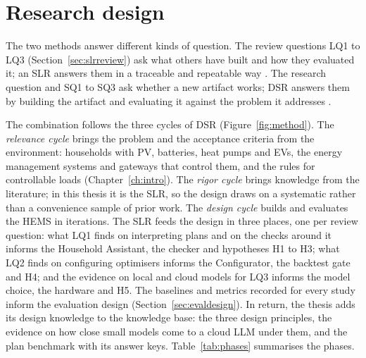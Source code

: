 \section{Research design}
\label{sec:design}

The two methods answer different kinds of question. The review questions
LQ1 to LQ3 (Section~\ref{sec:slrreview}) ask what others have built and
how they evaluated it; an SLR answers them in a traceable and repeatable
way \parencite{kitchenham2007}. The research question and SQ1 to SQ3
ask whether a new artifact works; DSR answers them by building the
artifact and evaluating it against the problem it addresses
\parencite{hevner2004,peffers2007}.

The combination follows the three cycles of DSR \parencite{hevner2007}
(Figure~\ref{fig:method}). The \textit{relevance cycle} brings the
problem and the acceptance criteria from the environment: households
with PV, batteries, heat pumps and EVs, the energy management systems
and gateways that control them, and the rules for controllable loads
(Chapter~\ref{ch:intro}). The
\textit{rigor cycle} brings knowledge from the literature; in this
thesis it is the SLR, so the design draws on a systematic rather than
a convenience sample of prior work. The \textit{design cycle} builds and
evaluates the HEMS in iterations. The SLR feeds the design in three
places, one per review question: what LQ1 finds on interpreting plans
and on the checks around it informs the Household Assistant, the
checker and hypotheses H1 to H3; what LQ2 finds on configuring
optimisers informs the Configurator, the backtest gate and H4; and the
evidence on local and cloud models for LQ3 informs the model choice,
the hardware and H5. The baselines and metrics recorded for every study
inform the evaluation design (Section~\ref{sec:evaldesign}). In return,
the thesis adds its design knowledge to the knowledge base: the three
design principles, the evidence on how close small models come to a
cloud LLM under them, and the plan benchmark with its answer keys.
Table~\ref{tab:phases} summarises the phases.

